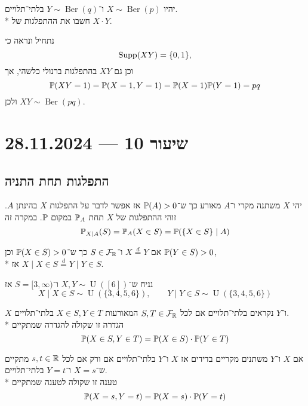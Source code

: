\begin{exercise}
	יהיו $X \sim \operatorname{Ber}(p)$ ו־$Y \sim \operatorname{Ber}(q)$ בלתי־תלויים. \\*
	חשבו את ההתפלגות של $X \cdot Y$.
\end{exercise}
\begin{solution}
	נתחיל ונראה כי
	\[
		\operatorname{Supp}(X Y) = \{0, 1\},
	\]
	וכן גם $XY$ בהתפלגות ברנולי כלשהי, אך
	\[
		\mathbb{P}(XY = 1)
		= \mathbb{P}(X = 1, Y = 1)
		= \mathbb{P}(X = 1) \mathbb{P}(Y = 1)
		= pq
	\]
	ולכן $XY \sim \operatorname{Ber}(pq)$.
\end{solution}

\section{שיעור 10 --- 28.11.2024}
\subsection{התפלגות תחת התניה}
\begin{definition}
	יהי $X$ משתנה מקרי ו־$A$ מאורע כך ש־$\mathbb{P}(A) > 0$ אז אפשר לדבר על התפלגות $X$ בהינתן $A$.
	זוהי ההתפלגות של $X$ תחת $\mathbb{P}_A$ במקום $\mathbb{P}$.
	במקרה זה
	\[
		\mathbb{P}_{X \mid A}(S) = \mathbb{P}_A(X \in S) = \mathbb{P}(\{X \in S\} \mid A)
	\]
\end{definition}
\begin{proposition}
	אם $X \overset{d}{=} Y$ ו־$S \in \mathcal{F}_{\mathbb{R}}$ כך ש־$\mathbb{P}(X \in S) > 0$ וכן $\mathbb{P}(Y \in S) > 0$, \\*
	אז $X \mid X \in S \overset{d}{=} Y \mid Y \in S$.
\end{proposition}
\begin{example}
	נניח ש־$X, Y \sim \operatorname{U}([6])$ ו־$S = [3, \infty)$ אז
	\[
		X \mid X \in S \sim \operatorname{U}(\{3, 4, 5, 6\}),
		\qquad
		Y \mid Y \in S \sim \operatorname{U}(\{3, 4, 5, 6\})
	\]
\end{example}
\begin{definition}
	$X$ ו־$Y$ נקראים בלתי־תלויים אם לכל $S, T \in \mathcal{F}_{\mathbb{R}}$ המאורעות $X \in S, Y \in T$ בלתי־תלויים. \\*
	הגדרה זו שקולה להגדרה שמתקיים
	\[
		\mathbb{P}(X \in S, Y \in T) = \mathbb{P}(X \in S) \cdot \mathbb{P}(Y \in T)
	\]
\end{definition}
\begin{proposition}
	אם $X$ ו־$Y$ משתנים מקריים בדידים אז $X$ ו־$Y$ בלתי־תלויים אם ורק אם לכל $s, t \in \mathbb{R}$ מתקיים ש־$X = s$ ו־$Y = t$ בלתי־תלויים. \\*
	טענה זו שקולה לטענה שמתקיים
	\[
		\mathbb{P}(X = s, Y = t) = \mathbb{P}(X = s) \cdot \mathbb{P}(Y = t)
	\]
\end{proposition}
